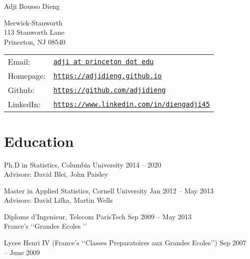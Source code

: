 \documentclass[letterpaper,200pt]{article}
\def\name{Adji Bousso Dieng}
\renewenvironment{itemize}{
  \begin{list}{}{
    \setlength{\leftmargin}{1.5em}
  }
}{
  \end{list}
}
\begin{document}
{\huge \name}


\vspace{0.25in}

\begin{minipage}{0.45\linewidth}
  Merwick-Stanworth \\
 113 Stanworth Lane \\
Princeton, NJ 08540
\end{minipage}
\begin{minipage}{0.45\linewidth}
  \begin{tabular}{ll}
    Email: & \href{mailto:adji at princeton dot edu}{\tt adji at princeton dot edu} \\
    Homepage: & \href{https://adjidieng.github.io}{\tt https://adjidieng.github.io} \\
    Github: & \href{https://github.com/adjidieng}  {\tt https://github.com/adjidieng}\\
    LinkedIn: &\href{https://www.linkedin.com/in/diengadji45}{\tt https://www.linkedin.com/in/diengadji45} \\
  \end{tabular}
\end{minipage}

\section*{Education}
\begin{itemize}
  \item Ph.D in Statistics, Columbia University \hfill{2014 -- 2020\\}
	   Advisors: David Blei, John Paisley
  \item Master in Applied Statistics, Cornell University \hfill{Jan 2012 -- May 2013\\}
  	  Advisors: David Lifka, Martin Wells
  \item Diplome d'Ingenieur, Telecom ParisTech \hfill{Sep 2009 -- May 2013\\}
  	   France's \lq\lq Grandes Ecoles \rq\rq
  \item Lycee Henri IV (France's   \lq\lq Classes Preparatoires aux Grandes Ecoles\rq\rq) \hfill{Sep 2007 -- June 2009}
\end{itemize}
\end{document}
